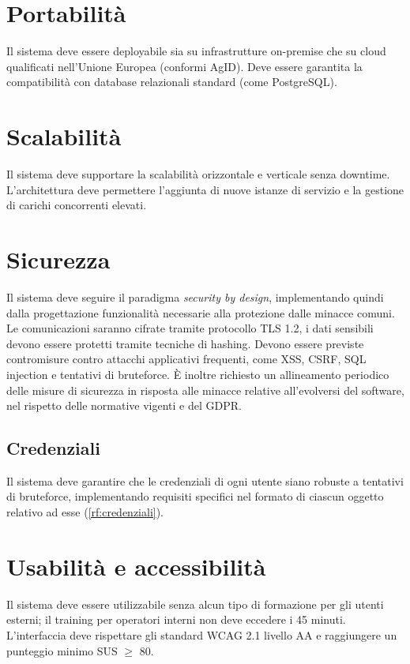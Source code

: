 \begin{rnfscope}
\section{Portabilità} \label{rnf:portabilita}
Il sistema deve essere deployabile sia su infrastrutture on-premise che su cloud qualificati nell’Unione Europea (conformi AgID).
Deve essere garantita la compatibilità con database relazionali standard (come PostgreSQL).

\section{Scalabilità} \label{rnf:scalabilita}
Il sistema deve supportare la scalabilità orizzontale e verticale senza downtime.
L’architettura deve permettere l’aggiunta di nuove istanze di servizio e la gestione di carichi concorrenti elevati.

\section{Sicurezza} \label{rnf:sicurezza}
Il sistema deve seguire il paradigma \emph{security by design}, implementando quindi dalla progettazione funzionalità necessarie alla protezione dalle minacce comuni.
Le comunicazioni saranno cifrate tramite protocollo TLS 1.2, i dati sensibili devono essere protetti tramite tecniche di hashing.
Devono essere previste contromisure contro attacchi applicativi frequenti, come XSS, CSRF, SQL injection e tentativi
di bruteforce.
È inoltre richiesto un allineamento periodico delle misure di sicurezza in risposta alle minacce relative all'evolversi del software, nel rispetto delle normative vigenti e del GDPR\@.

\subsection{Credenziali} \label{rnf:credenziali}
Il sistema deve garantire che le credenziali di ogni utente siano robuste a tentativi di bruteforce, implementando requisiti specifici nel formato di ciascun oggetto relativo ad esse (\ref{rf:credenziali}). 

\section{Usabilità e accessibilità} \label{rnf:useacc}
Il sistema deve essere utilizzabile senza alcun tipo di formazione per gli utenti esterni; il training per operatori interni non deve eccedere i 45 minuti.
L’interfaccia deve rispettare gli standard WCAG 2.1 livello AA e raggiungere un punteggio minimo SUS $\ge$ 80.

\end{rnfscope}